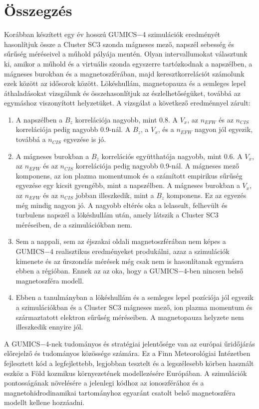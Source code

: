 \documentclass[b5paper,10pt]{article}
\begin{document}
\section*{Összegzés}
\label{sec:osszegzes}

Korábban készített egy év hosszú GUMICS$-$4 szimulációk eredményét hasonlítjuk össze a Cluster SC3 szonda mágneses mező, napszél sebesség és sűrűség méréseivel a műhold pályája mentén. Olyan intervallumokat választunk ki, amikor a műhold és a virtuális szonda egyszerre tartózkodnak a napszélben, a mágneses burokban és a magnetoszférában, majd keresztkorrelációt számolunk ezek között az idősorok között. Lökéshullám, magnetopauza és a semleges lepel áthaladásokat vizsgálunk és összehasonlítjuk az észlelhetőségüket, továbbá az egymáshoz viszonyított helyzetüket. A vizsgálat a következő eredménnyel zárult:
\begin{enumerate}
\setlength{\parskip}{-3pt}
\item A napszélben a $B_{z}$ korrelációja nagyobb, mint 0.8. A $V_{x}$, az $n_{EFW}$ és az $n_{CIS}$ korrelációja pedig nagyobb 0.9-nál. A $B_{z}$, a $V_{x}$, és a $n_{EFW}$ nagyon jól egyezik, továbbá a $n_{CIS}$ egyezése is jó.
\item A mágneses burokban a $B_{z}$ korrelációs együtthatója nagyobb, mint 0.6. A $V_{x}$, az $n_{EFW}$ és az $n_{CIS}$ korrelációja pedig nagyobb 0.9-nál. A mágneses mező komponens, az ion plazma momentumok és a számított empirikus sűrűség egyezése egy kicsit gyengébb, mint a napszélben. A mágneses burokban a $V_{x}$, az $n_{EFW}$ és az $n_{CIS}$ jobban illeszkedik, mint a $B_{z}$ komponens. Ez az egyezés még mindig nagyon jó. A nagyobb eltérés oka a lelassult, felhevült és turbulens napszél a lökéshullám után, amely látszik a Cluster SC3 méréseiben, de a szimulációkban nem.   
\item Sem a nappali, sem az éjszakai oldali magnetoszférában nem képes a GUMICS$-$4 realisztikus eredményeket produkálni, azaz a szimulációk kimenete és az űrszondás mérések még csak nem is hasonlítanak egymásra ebben a régióban. Ennek az az oka, hogy a GUMICS$-$4-ben nincsen belső magnetoszféra modell. 
\item Ebben a tanulmányban a lökéshullám és a semleges lepel pozíciója jól egyezik a szimulációkban és a Cluster SC3 mágneses mező, ion plazma momentum és származtatott elektron sűrűség méréseiben. A magnetopauza helyzete nem illeszkedik ennyire jól. 
\end{enumerate}
A GUMICS$-$4-nek tudományos és stratégiai jelentősége van az európai űridőjárás előrejelző és tudományos közössége számára. Ez a Finn Meteorológiai Intézetben fejlesztett kód a legfejlettebb, legjobban tesztelt és a legszélesebb körben használt eszköz a Föld kozmikus környezetének modellezésére Európában. A szimulációk pontosságának növelésére a jelenlegi kódhoz az ionoszférához és a magnetohidrodinamikai tartományhoz egyaránt csatolt belső magnetoszféra modellt kellene hozzáadni. 
\end{document}
